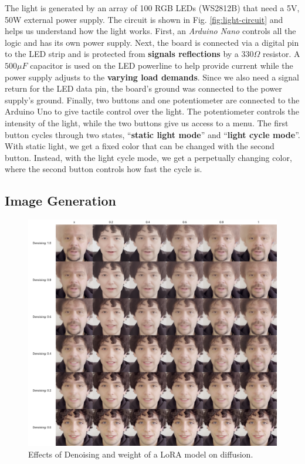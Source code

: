 \documentclass[preprint]{elsarticle}
\begin{document}
The light is generated by an array of 100 RGB LEDs (WS2812B) that need a 5V, 50W external power supply. 
The circuit is shown in Fig. \ref{fig:light-circuit} and helps us understand how the light works. 
First, an \emph{Arduino Nano} controls all the logic and has its own power supply. 
Next, the board is connected via a digital pin to the LED strip and is protected 
from \textbf{signals reflections} by a $330\Omega$ resistor. 
A $500 \mu F$ capacitor is used on the LED powerline to help provide current 
while the power supply adjusts to the \textbf{varying load demands}. 
Since we also need a signal return for the LED data pin, the board's ground was 
connected to the power supply's ground. 
Finally, two buttons and one potentiometer are connected to the Arduino Uno to give tactile 
control over the light. 
The potentiometer controls the intensity of the light, 
while the two buttons give us access to a menu. 
The first button cycles through two states, ``\textbf{static light mode}'' and ``\textbf{light cycle mode}''. 
With static light, we get a fixed color that can be changed with the second button. Instead, 
with the light cycle mode, we get a perpetually changing color, 
where the second button controls how fast the cycle is.



\subsection{Image Generation}

\begin{figure}[t]
	\centering
	\includegraphics[scale=0.2, keepaspectratio]{img/project_img/grid-santini.png}
	\caption{Effects of Denoising and weight of a LoRA model on diffusion.}
	\label{fig:grid-santini}
\end{figure}
\end{document}
